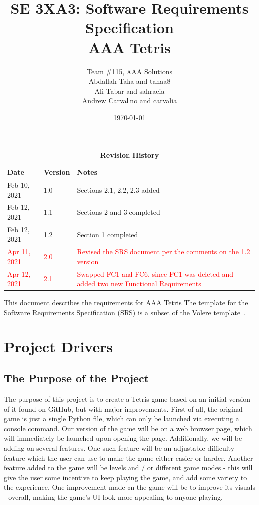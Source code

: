 \documentclass[12pt, titlepage]{article}
\title{SE 3XA3: Software Requirements Specification\\AAA Tetris}
\author{Team \#115, AAA Solutions
		\\ Abdallah Taha and tahaa8
		\\ Ali Tabar and sahraeia
		\\ Andrew Carvalino and carvalia
}
\date{\today}
\begin{document}
\maketitle

\tableofcontents
\listoftables
\listoffigures

\begin{table}[h!]
\caption{\bf Revision History}
\begin{tabularx}{\textwidth}{p{3cm}p{2cm}X}
\toprule {\bf Date} & {\bf Version} & {\bf Notes}\\
\midrule
Feb 10, 2021 & 1.0 & Sections 2.1, 2.2, 2.3 added\\
Feb 12, 2021 & 1.1 & Sections 2 and 3 completed\\
Feb 12, 2021 & 1.2 & Section 1 completed\\
\textcolor{red}{Apr 11, 2021} & \textcolor{red}{2.0} & \textcolor{red}{Revised the SRS document per the comments on the 1.2 version}\\
\textcolor{red}{Apr 12, 2021} & \textcolor{red}{2.1} & \textcolor{red}{Swapped FC1 and FC6, since FC1 was deleted and added two new Functional Requirements} \\
\bottomrule
\end{tabularx}
\end{table}

\newpage


This document describes the requirements for AAA Tetris The template for the Software
Requirements Specification (SRS) is a subset of the Volere
template~\citep{RobertsonAndRobertson2012}.

\section{Project Drivers}

\subsection{The Purpose of the Project}
The purpose of this project is to create a Tetris game based on an initial version of it found on GitHub, but with major improvements. First of all, the original game is just a single Python file, which can only be launched via executing a console command. Our version of the game will be on a web browser page, which will immediately be launched upon opening the page. Additionally, we will be adding on several features. One such feature will be an adjustable difficulty feature which the user can use to make the game either easier or harder. Another feature added to the game will be levels and / or different game modes - this will give the user some incentive to keep playing the game, and add some variety to the experience. 
One improvement made on the game will be to improve its visuals - overall, making the game’s UI look more appealing to anyone playing.
\end{document}
